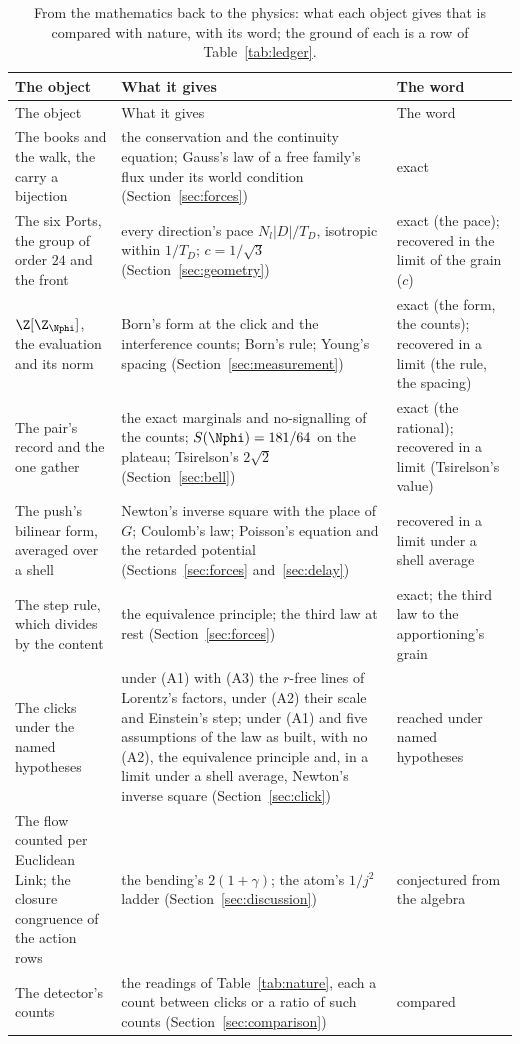 {\scriptsize\setlength{\tabcolsep}{3pt}
\begin{longtable}{L{1.9in}L{2.9in}L{1.3in}}
\caption{\label{tab:back}From the mathematics back to the physics: what each object gives that is compared with nature, with its word; the ground of each is a row of Table~\ref{tab:ledger}.}\\
\toprule
The object & What it gives & The word \\
\midrule
\endfirsthead
\toprule
The object & What it gives & The word \\
\midrule
\endhead
\bottomrule
\endlastfoot
The books and the walk, the carry a bijection & the conservation and the continuity equation; Gauss's law of a free family's flux under its world condition (Section~\ref{sec:forces}) & exact \\
The six Ports, the group of order $24$ and the front & every direction's pace $N_l|D|/T_D$, isotropic within $1/T_D$; $c = 1/\sqrt3$ (Section~\ref{sec:geometry}) & exact (the pace); recovered in the limit of the grain ($c$) \\
$\Z[\Z_{\Nphi}]$, the evaluation and its norm & Born's form at the click and the interference counts; Born's rule; Young's spacing (Section~\ref{sec:measurement}) & exact (the form, the counts); recovered in a limit (the rule, the spacing) \\
The pair's record and the one gather & the exact marginals and no-signalling of the counts; $S(\Nphi) = 181/64$ on the plateau; Tsirelson's $2\sqrt2$ (Section~\ref{sec:bell}) & exact (the rational); recovered in a limit (Tsirelson's value) \\
The push's bilinear form, averaged over a shell & Newton's inverse square with the place of $G$; Coulomb's law; Poisson's equation and the retarded potential (Sections~\ref{sec:forces} and~\ref{sec:delay}) & recovered in a limit under a shell average \\
The step rule, which divides by the content & the equivalence principle; the third law at rest (Section~\ref{sec:forces}) & exact; the third law to the apportioning's grain \\
The clicks under the named hypotheses & under (A1) with (A3) the $r$-free lines of Lorentz's factors, under (A2) their scale and Einstein's step; under (A1) and five assumptions of the law as built, with no (A2), the equivalence principle and, in a limit under a shell average, Newton's inverse square (Section~\ref{sec:click}) & reached under named hypotheses \\
The flow counted per Euclidean Link; the closure congruence of the action rows & the bending's $2(1 + \gamma)$; the atom's $1/j^2$ ladder (Section~\ref{sec:discussion}) & conjectured from the algebra \\
The detector's counts & the readings of Table~\ref{tab:nature}, each a count between clicks or a ratio of such counts (Section~\ref{sec:comparison}) & compared \\
\end{longtable}}



